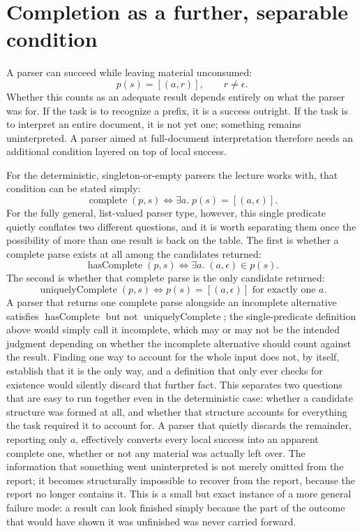 \documentclass[11pt]{article}
\begin{document}
\section{Completion as a further, separable condition}

A parser can succeed while leaving material unconsumed:
\[
p(s) = [(a, r)], \qquad r \neq \epsilon.
\]
Whether this counts as an adequate result depends entirely on what the parser was for. If the task is to recognize a prefix, it is a success outright. If the task is to interpret an entire document, it is not yet one; something remains uninterpreted. A parser aimed at full-document interpretation therefore needs an additional condition layered on top of local success.

For the deterministic, singleton-or-empty parsers the lecture works with, that condition can be stated simply:
\[
\operatorname{complete}(p, s) \iff \exists a.\; p(s) = [(a, \epsilon)].
\]
For the fully general, list-valued parser type, however, this single predicate quietly conflates two different questions, and it is worth separating them once the possibility of more than one result is back on the table. The first is whether a complete parse exists at all among the candidates returned:
\[
\operatorname{hasComplete}(p, s) \iff \exists a.\; (a, \epsilon) \in p(s).
\]
The second is whether that complete parse is the only candidate returned:
\[
\operatorname{uniquelyComplete}(p, s) \iff p(s) = [(a, \epsilon)] \text{ for exactly one } a.
\]
A parser that returns one complete parse alongside an incomplete alternative satisfies $\operatorname{hasComplete}$ but not $\operatorname{uniquelyComplete}$; the single-predicate definition above would simply call it incomplete, which may or may not be the intended judgment depending on whether the incomplete alternative should count against the result. Finding one way to account for the whole input does not, by itself, establish that it is the only way, and a definition that only ever checks for existence would silently discard that further fact. This separates two questions that are easy to run together even in the deterministic case: whether a candidate structure was formed at all, and whether that structure accounts for everything the task required it to account for. A parser that quietly discards the remainder, reporting only $a$, effectively converts every local success into an apparent complete one, whether or not any material was actually left over. The information that something went uninterpreted is not merely omitted from the report; it becomes structurally impossible to recover from the report, because the report no longer contains it. This is a small but exact instance of a more general failure mode: a result can look finished simply because the part of the outcome that would have shown it was unfinished was never carried forward.
\end{document}
